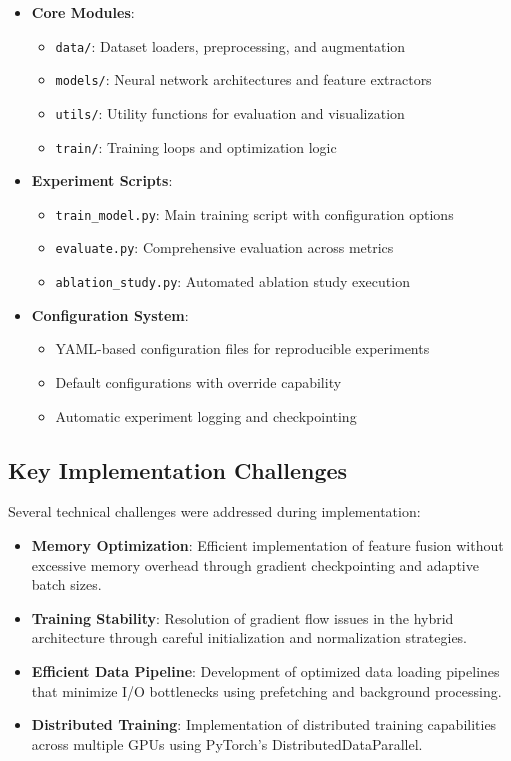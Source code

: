 \begin{itemize}
    \item \textbf{Core Modules}:
    \begin{itemize}
        \item \texttt{data/}: Dataset loaders, preprocessing, and augmentation
        \item \texttt{models/}: Neural network architectures and feature extractors
        \item \texttt{utils/}: Utility functions for evaluation and visualization
        \item \texttt{train/}: Training loops and optimization logic
    \end{itemize}
    
    \item \textbf{Experiment Scripts}:
    \begin{itemize}
        \item \texttt{train\_model.py}: Main training script with configuration options
        \item \texttt{evaluate.py}: Comprehensive evaluation across metrics
        \item \texttt{ablation\_study.py}: Automated ablation study execution
    \end{itemize}
    
    \item \textbf{Configuration System}:
    \begin{itemize}
        \item YAML-based configuration files for reproducible experiments
        \item Default configurations with override capability
        \item Automatic experiment logging and checkpointing
    \end{itemize}
\end{itemize}

\subsection{Key Implementation Challenges}
Several technical challenges were addressed during implementation:

\begin{itemize}
    \item \textbf{Memory Optimization}: Efficient implementation of feature fusion without excessive memory overhead through gradient checkpointing and adaptive batch sizes.
    
    \item \textbf{Training Stability}: Resolution of gradient flow issues in the hybrid architecture through careful initialization and normalization strategies.
    
    \item \textbf{Efficient Data Pipeline}: Development of optimized data loading pipelines that minimize I/O bottlenecks using prefetching and background processing.
    
    \item \textbf{Distributed Training}: Implementation of distributed training capabilities across multiple GPUs using PyTorch's DistributedDataParallel.
\end{itemize}

